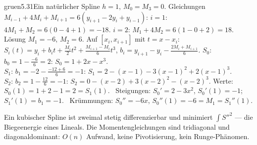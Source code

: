 \begin{loesungkarte}{gruen}{5.31}{Ein natürlicher Spline}
$h = 1$, $M_0 = M_3 = 0$. Gleichungen $M_{i-1} + 4M_i + M_{i+1} = 6(y_{i+1} - 2y_i + y_{i-1})$: $i = 1$: $4M_1 + M_2 = 6(0 - 4 + 1) = -18$. $i = 2$: $M_1 + 4M_2 = 6(1 - 0 + 2) = 18$. Lösung $M_1 = -6$, $M_2 = 6$.
Auf $[x_i, x_{i+1}]$ mit $t = x - x_i$: $S_i(t) = y_i + b_it + \frac{M_i}2t^{2} + \frac{M_{i+1} - M_i}6t^{3}$, $b_i = y_{i+1} - y_i - \frac{2M_i + M_{i+1}}6$.
$S_0$: $b_0 = 1 - \frac{-6}6 = 2$: $S_0 = 1 + 2x - x^{3}$. \\
$S_1$: $b_1 = -2 - \frac{-12 + 6}6 = -1$: $S_1 = 2 - (x - 1) - 3(x - 1)^{2} + 2(x - 1)^{3}$. \\
$S_2$: $b_2 = 1 - \frac{12}6 = -1$: $S_2 = 0 - (x - 2) + 3(x - 2)^{2} - (x - 2)^{3}$.
Werte: $S_0(1) = 1 + 2 - 1 = 2 = S_1(1)$. \checkmark\ Steigungen: $S_0' = 2 - 3x^{2}$, $S_0'(1) = -1$; $S_1'(1) = b_1 = -1$. \checkmark\ Krümmungen: $S_0'' = -6x$, $S_0''(1) = -6 = M_1 = S_1''(1)$. \checkmark
\begin{center}
\end{center}
\begin{mitnehmen}\kastentext
Ein kubischer Spline ist zweimal stetig differenzierbar und minimiert $\int S''^{2}$ --- die Biegeenergie eines Lineals. Die Momentengleichungen sind tridiagonal und diagonaldominant: $O(n)$ Aufwand, keine Pivotisierung, kein Runge-Phänomen.
\end{mitnehmen}
\end{loesungkarte}

